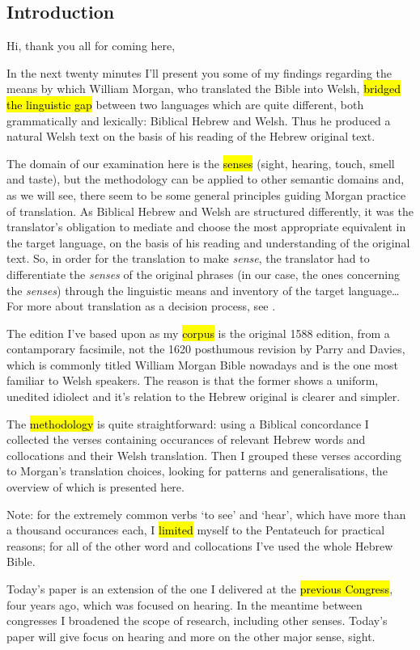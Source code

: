 \begin{paper}
	\setcounter{section}{-1}
	\section{Introduction}

	{\click} Hi, thank you all for coming here,

	{\click} In the next twenty minutes I’ll present you some of my findings regarding the means by which William Morgan, who translated the Bible into Welsh, \hl{bridged the linguistic gap} between two languages which are quite different, both grammatically and lexically: Biblical Hebrew and Welsh. Thus he produced a natural Welsh text on the basis of his reading of the Hebrew original text.

	The domain of our examination here is the \hl{senses} (sight, hearing, touch, smell and taste), but the methodology can be applied to other semantic domains and, as we will see, there seem to be some general principles guiding Morgan practice of translation. As Biblical Hebrew and Welsh are structured differently, it was the translator’s obligation to mediate and choose the most appropriate equivalent in the target language, on the basis of his reading and understanding of the original text. So, in order for the translation to make \emph{sense}, the translator had to differentiate the \emph{senses} of the original phrases (in our case, the ones concerning the \emph{senses}) through the linguistic means and inventory of the target language… For more about translation as a decision process, see \cite{levy.j:1967:translation}.

	{\click} The edition I’ve based upon as my \hl{corpus} is the original 1588 edition, from a contamporary facsimile, not the 1620 posthumous revision by Parry and Davies, which is commonly titled William Morgan Bible nowadays and is the one most familiar to Welsh speakers. The reason is that the former shows a uniform, unedited idiolect and it’s relation to the Hebrew original is clearer and simpler.

	{\click} The \hl{methodology} is quite straightforward: using a Biblical concordance I collected the verses containing occurances of relevant Hebrew words and collocations and their Welsh translation. Then I grouped these verses according to Morgan’s translation choices, looking for patterns and generalisations, the overview of which is presented here.

	{\click} Note: for the extremely common verbs  ‘to see’ and  ‘hear’, which have more than a thousand occurances each, I \hl{limited} myself to the Pentateuch for practical reasons; for all of the other word and collocations I’ve used the whole Hebrew Bible.

	{\click} Today’s paper is an extension of the one I delivered at the \hl{previous Congress}, four years ago, which was focused on hearing. In the meantime between congresses I broadened the scope of research, including other senses. Today’s paper will give focus on hearing and more on the other major sense, sight.
\end{paper}
